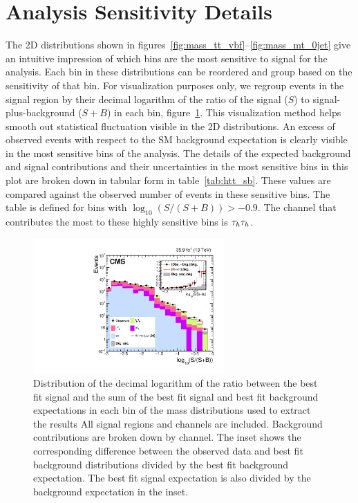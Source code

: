 \section{Analysis Sensitivity Details}
The 2D distributions shown in figures~\ref{fig:mass_tt_vbf}--\ref{fig:mass_mt_0jet} give an intuitive
impression of which bins are the most sensitive to signal for the analysis. Each bin in these distributions
can be reordered and group based on the sensitivity of that bin. For visualization purposes only, we regroup 
events in the signal region by their decimal logarithm of the ratio of the signal ($S$) to 
signal-plus-background ($S+B$) in each bin, figure~\ref{fig:htt_sb}. This visualization method helps smooth out statistical
fluctuation visible in the 2D distributions. An excess of observed events with respect to the 
SM background expectation is clearly visible in the most sensitive bins of the analysis.
The details of the expected background and signal contributions and their uncertainties in the most sensitive bins in 
this plot are broken down in tabular form in table~\ref{tab:htt_sb}. 
These values are compared against the observed number of events in these sensitive bins. 
The table is defined for bins with $\log_{10}(S/(S+B))>-0.9$. The channel that contributes the 
most to these highly sensitive bins is $\tau_{h}\tau_{h}$.

\begin{figure}[htb]
  \centering
    \includegraphics[width=0.65\textwidth]{higgs_to_taus/plots/Figure_018.pdf}
   \caption{Distribution of the decimal logarithm of the ratio between the best fit signal and the sum of 
the best fit signal and best fit background expectations in each bin of the mass distributions used to extract the results 
All signal regions and channels are included. Background contributions are broken down by channel. 
The inset shows the corresponding difference between the observed data and best fit background 
distributions divided by the best fit background expectation. The best fit signal expectation 
is also divided by the background expectation in the inset.
   }
\label{fig:htt_sb}

\end{figure}

